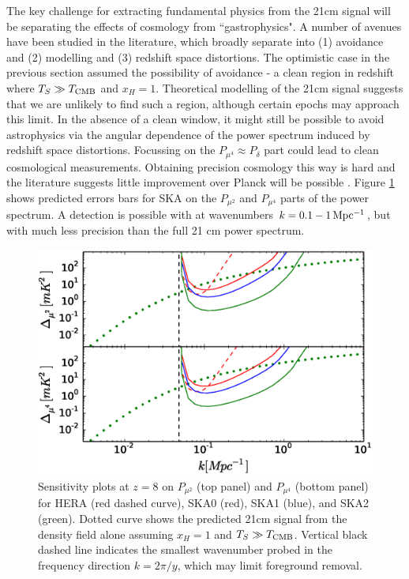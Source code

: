 \documentclass{PoS}
\begin{document}
The key challenge for extracting fundamental physics from the 21cm signal will be separating the effects of cosmology from ``gastrophysics". A number of avenues have been studied in the literature, which broadly separate into (1) avoidance and (2) modelling and (3) redshift space distortions. The optimistic case in the previous section assumed the possibility of avoidance - a clean region in redshift where $T_S\gg T_{\rm CMB}$ and $x_H=1$. Theoretical modelling of the 21cm signal \citep[e.g.][]{2008PhRvD..78j3511P,2011MNRAS.410.1377T,2013MNRAS.431..621M,2014MNRAS.437L..36F} suggests that we are unlikely to find such a region, although certain epochs may approach this limit. In the absence of a clean window, it might still be possible to avoid astrophysics via the angular dependence of the power spectrum induced by redshift space distortions. Focussing on the $P_{\mu^4}\approx P_\delta$ part could lead to clean cosmological measurements. Obtaining precision cosmology this way is hard and the literature suggests little improvement over Planck will be possible \citep{2006ApJ...653..815M,2008PhRvD..78b3529M}. Figure \ref{fig:musensitivity} shows predicted errors bars for SKA on the $P_{\mu^2}$ and $P_{\mu^4}$ parts of the power spectrum. A detection is possible with at wavenumbers $k=0.1-1{\rm\,Mpc^{-1}}$, but with much less precision than the full 21 cm power spectrum. 

\begin{figure}[htbp]
\begin{center}
\includegraphics[scale=0.45]{figures/musensitivityPlotTidy_z8.eps}
\caption{Sensitivity plots at $z=8$ on $P_{\mu^2}$ (top panel) and $P_{\mu^4}$ (bottom panel) for HERA (red dashed curve), SKA0 (red), SKA1 (blue), and SKA2 (green). Dotted curve shows the predicted 21cm signal from the density field alone assuming $x_H=1$ and $T_S\gg T_{\rm CMB}$. Vertical black dashed line indicates the smallest wavenumber probed in the frequency direction $k=2\pi/y$, which may limit foreground removal. }
\label{fig:musensitivity}
\end{center}
\end{figure}
\end{document}
